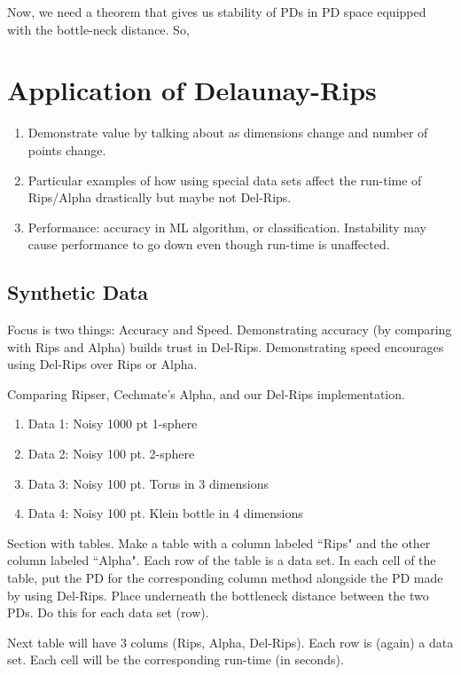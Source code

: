 \documentclass[letterpaper,titlepage]{article}
\begin{document}
    Now, we need a theorem that gives us stability of PDs in PD space equipped with the bottle-neck distance. So,



    
\section{Application of Delaunay-Rips}
\begin{enumerate}
    \item Demonstrate value by talking about as dimensions change and number of points change.
    \item Particular examples of how using special data sets affect the run-time of Rips/Alpha drastically but maybe not Del-Rips.
    \item Performance: accuracy in ML algorithm, or classification. Instability may cause performance to go down even though run-time is unaffected.
\end{enumerate}

\subsection{Synthetic Data}
    Focus is two things: Accuracy and Speed. Demonstrating accuracy (by comparing with Rips and Alpha) builds trust in Del-Rips. Demonstrating speed encourages using Del-Rips over Rips or Alpha.

    Comparing Ripser, Cechmate's Alpha, and our Del-Rips implementation.
    \begin{enumerate}
        \item Data 1: Noisy 1000 pt 1-sphere
        \item Data 2: Noisy 100 pt. 2-sphere
        \item Data 3: Noisy 100 pt. Torus in 3 dimensions
        \item Data 4: Noisy 100 pt. Klein bottle in 4 dimensions
    \end{enumerate}

    Section with tables. Make a table with a column labeled ``Rips" and the other column labeled ``Alpha". Each row of the table is a data set. In each cell of the table, put the PD for the corresponding column method alongside the PD made by using Del-Rips. Place underneath the bottleneck distance between the two PDs. Do this for each data set (row).

    Next table will have 3 colums (Rips, Alpha, Del-Rips). Each row is (again) a data set. Each cell will be the corresponding run-time (in seconds).
\end{document}
